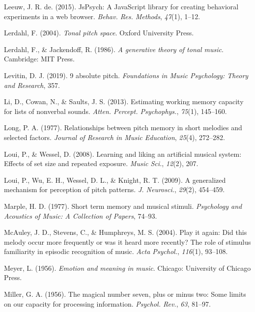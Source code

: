 \documentclass[english,man]{apa6}
\begin{document}
\leavevmode\hypertarget{ref-De_Leeuw2015-bl}{}%
Leeuw, J. R. de. (2015). JsPsych: A JavaScript library for creating behavioral experiments in a web browser. \emph{Behav. Res. Methods}, \emph{47}(1), 1--12.

\leavevmode\hypertarget{ref-Lerdahl2004-xc}{}%
Lerdahl, F. (2004). \emph{Tonal pitch space}. Oxford University Press.

\leavevmode\hypertarget{ref-Lerdahl1986-cn}{}%
Lerdahl, F., \& Jackendoff, R. (1986). \emph{A generative theory of tonal music}. Cambridge: MIT Press.

\leavevmode\hypertarget{ref-Levitin2019-sb}{}%
Levitin, D. J. (2019). 9 absolute pitch. \emph{Foundations in Music Psychology: Theory and Research}, 357.

\leavevmode\hypertarget{ref-Li2013-my}{}%
Li, D., Cowan, N., \& Saults, J. S. (2013). Estimating working memory capacity for lists of nonverbal sounds. \emph{Atten. Percept. Psychophys.}, \emph{75}(1), 145--160.

\leavevmode\hypertarget{ref-Long1977-re}{}%
Long, P. A. (1977). Relationships between pitch memory in short melodies and selected factors. \emph{Journal of Research in Music Education}, \emph{25}(4), 272--282.

\leavevmode\hypertarget{ref-Loui2008-zy}{}%
Loui, P., \& Wessel, D. (2008). Learning and liking an artificial musical system: Effects of set size and repeated exposure. \emph{Music Sci.}, \emph{12}(2), 207.

\leavevmode\hypertarget{ref-Loui2009-sr}{}%
Loui, P., Wu, E. H., Wessel, D. L., \& Knight, R. T. (2009). A generalized mechanism for perception of pitch patterns. \emph{J. Neurosci.}, \emph{29}(2), 454--459.

\leavevmode\hypertarget{ref-Marple1977-pm}{}%
Marple, H. D. (1977). Short term memory and musical stimuli. \emph{Psychology and Acoustics of Music: A Collection of Papers}, 74--93.

\leavevmode\hypertarget{ref-McAuley2004-eq}{}%
McAuley, J. D., Stevens, C., \& Humphreys, M. S. (2004). Play it again: Did this melody occur more frequently or was it heard more recently? The role of stimulus familiarity in episodic recognition of music. \emph{Acta Psychol.}, \emph{116}(1), 93--108.

\leavevmode\hypertarget{ref-Meyer1956-gc}{}%
Meyer, L. (1956). \emph{Emotion and meaning in music}. Chicago: University of Chicago Press.

\leavevmode\hypertarget{ref-Miller1956-np}{}%
Miller, G. A. (1956). The magical number seven, plus or minus two: Some limits on our capacity for processing information. \emph{Psychol. Rev.}, \emph{63}, 81--97.
\end{document}
